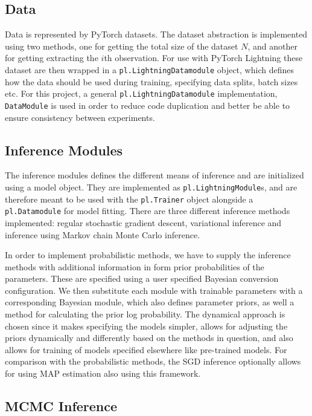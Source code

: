 \subsection{Data}
Data is represented by PyTorch datasets.
The dataset abstraction is implemented using two methods, one for getting the total size of the dataset $N$, and another for getting extracting the $i$th observation.
For use with PyTorch Lightning these dataset are then wrapped in a \texttt{pl.LightningDatamodule} object, which defines how the data should be used during training, specifying data splits, batch sizes etc.
For this project, a general \texttt{pl.LightningDatamodule} implementation, \texttt{DataModule} is used in order to reduce code duplication and better be able to ensure consistency between experiments. 

\subsection{Inference Modules}
The inference modules defines the different means of inference and are initialized using a model object.
They are implemented as \texttt{pl.LightningModule}s, and are therefore meant to be used with the \texttt{pl.Trainer} object alongside a \texttt{pl.Datamodule} for model fitting. 
There are three different inference methods implemented: regular stochastic gradient descent, variational inference and inference using Markov chain Monte Carlo inference.

In order to implement probabilistic methods, we have to supply the inference methods with additional information in form prior probabilities of the parameters. 
These are specified using a user specified Bayesian conversion configuration.
We then substitute each module with trainable parameters with a corresponding Bayesian module, which also defines parameter priors, as well a method for calculating the prior log probability.
The dynamical approach is chosen since it makes specifying the models simpler, allows for adjusting the priors dynamically and differently based on the methods in question, and also allows for training of models specified elsewhere like pre-trained models. 
For comparison with the probabilistic methods, the SGD inference optionally allows for using MAP estimation also using this framework.

\subsection{MCMC Inference}

